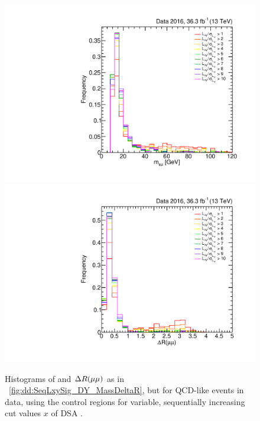 \begin{figure}[p]
  \centering
  \includegraphics[width=\DSquareWidth]{figures/displaced/BGEST_EffectOfLxySigCut_Mass_Data_QCD-Like.pdf}
  \hspace*{-2em}
  \includegraphics[width=\DSquareWidth]{figures/displaced/BGEST_EffectOfLxySigCut_DeltaR_Data_QCD-Like.pdf}
  \caption[Histograms of \mMuMu and $\deltaR(\Pgm\Pgm)$ for QCD-like events in data for sequentially increasing cut values of \LxySig.]{Histograms of  \mMuMu and  $\deltaR(\Pgm\Pgm)$ as in \Fig~\ref{fig:dd:SeqLxySig_DY_MassDeltaR}, but for QCD-like events in data, using the control regions  for variable, sequentially increasing cut values $x$ of DSA \LxySig.}
  \label{fig:dd:SeqLxySig_QCD_MassDeltaR}
\end{figure}

